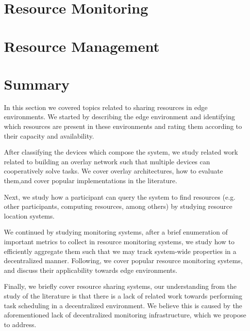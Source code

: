 \section{Resource Monitoring} \label{sec:res_monitoring} 

\section{Resource Management} \label{sec:res_management} 

\section{Summary}

In this section we covered topics related to sharing resources in edge environments. We started by describing the edge environment and identifying which resources are present in these environments and rating them according to their capacity and availability. 

After classifying the devices which compose the system, we study related work related to building an overlay network such that multiple devices can cooperatively solve tasks. We cover overlay architectures, how to evaluate them,and cover popular implementations in the literature. 

Next, we study how a participant can query the system to find resources (e.g. other participants, computing resources, among others) by studying resource location systems.

We continued by studying monitoring systems, after a brief enumeration of important metrics to collect in resource monitoring systems, we study how to efficiently aggregate them such that we may track system-wide properties in a decentralized manner. Following, we cover popular resource monitoring systems, and discuss their applicability towards edge environments. 

Finally, we briefly cover resource sharing systems, our understanding from the study of the literature is that there is a lack of related work towards performing task scheduling in a decentralized environment. We believe this is caused by the aforementioned lack of decentralized monitoring infrastructure, which we propose to address.